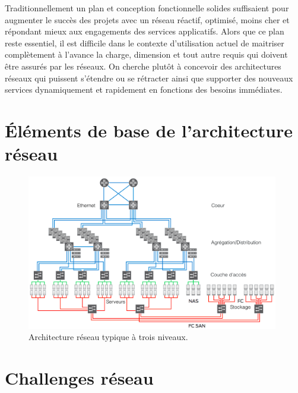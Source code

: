 Traditionnellement un plan et conception fonctionnelle solides suffisaient pour augmenter le succès des projets avec un réseau réactif, optimisé, moins cher et répondant mieux aux engagements des services applicatifs. Alors que ce plan reste essentiel, il est difficile dans le contexte d'utilisation actuel de maitriser complètement  à l'avance la charge, dimension et tout autre requis qui doivent être assurés par les réseaux. On cherche plutôt à concevoir des architectures réseaux qui puissent s'étendre ou se rétracter ainsi que supporter des nouveaux services dynamiquement et rapidement  en fonctions des besoins immédiates. \cite{ibmPlanningVirtCCchap4}


\section{Éléments de base de l'architecture réseau}

\begin{figure}[h]
\begin{center}
\includegraphics[width=0.98\textwidth]{images/LegacyNetworkArchitecture} 
\caption{Architecture réseau typique à trois niveaux. \cite{cloudReadyNetworkJuniper}}
\end{center}
\end{figure}

\section{Challenges réseau}

